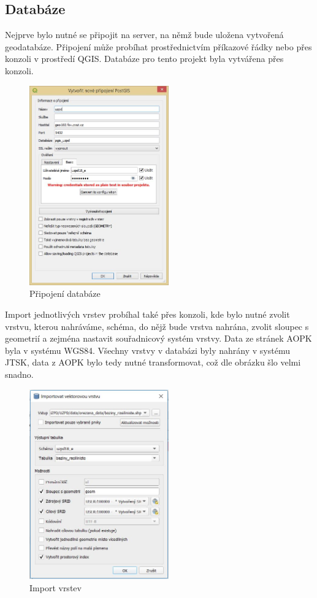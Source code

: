 \documentclass[a4paper, 12pt]{article}
\begin{document}
\subsection{Databáze}
Nejprve bylo nutné se připojit na server, na němž bude uložena vytvořená geodatabáze. Připojení může probíhat prostřednictvím příkazové řádky nebo přes konzoli v prostředí QGIS. Databáze pro tento projekt byla vytvářena přes konzoli. 

\begin{figure}[h!]
	\centering
	\includegraphics[width=6cm]{pictures/pripojeni.jpg}
	\caption{Připojení databáze}
\end{figure}

Import jednotlivých vrstev probíhal také přes konzoli, kde bylo nutné zvolit vrstvu, kterou nahráváme, schéma, do nějž bude vrstva nahrána, zvolit sloupec s geometrií a zejména nastavit souřadnicový systém vrstvy. Data ze stránek AOPK byla v systému WGS84. Všechny vrstvy v databázi byly nahrány v systému JTSK, data z AOPK bylo tedy nutné transformovat, což dle obrázku šlo velmi snadno.


\begin{figure}[h!]
	\centering
	\includegraphics[width=6cm]{pictures/import.jpg}
	\caption{Import vrstev}
\end{figure}
\end{document}
